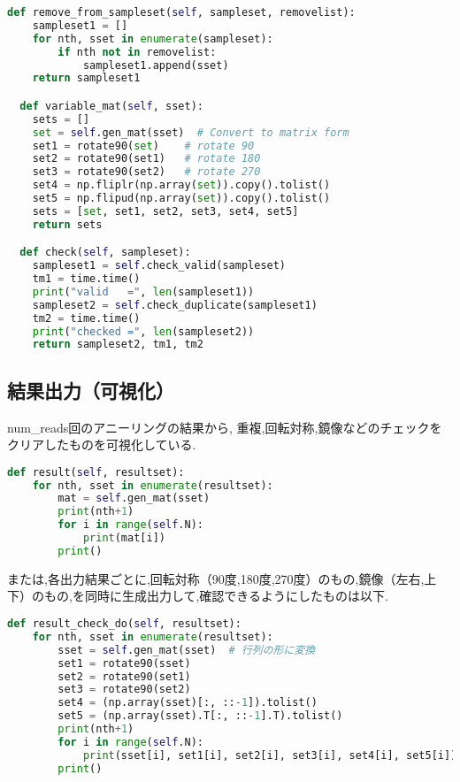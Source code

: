 \documentclass[uplatex,dvipdfmx,a4paper,11pt,oneside,openany]{jsbook}
\begin{document}
\begin{lstlisting}[language=Python]
  def remove_from_sampleset(self, sampleset, removelist):
    sampleset1 = []
    for nth, sset in enumerate(sampleset):
        if nth not in removelist:
            sampleset1.append(sset)
    return sampleset1

  def variable_mat(self, sset):
    sets = []
    set = self.gen_mat(sset)  # Convert to matrix form
    set1 = rotate90(set)    # rotate 90
    set2 = rotate90(set1)   # rotate 180
    set3 = rotate90(set2)   # rotate 270
    set4 = np.fliplr(np.array(set)).copy().tolist()
    set5 = np.flipud(np.array(set)).copy().tolist()
    sets = [set, set1, set2, set3, set4, set5]
    return sets

  def check(self, sampleset):
    sampleset1 = self.check_valid(sampleset)
    tm1 = time.time()
    print("valid   =", len(sampleset1))
    sampleset2 = self.check_duplicate(sampleset1)
    tm2 = time.time()
    print("checked =", len(sampleset2))
    return sampleset2, tm1, tm2
\end{lstlisting}

\subsection{結果出力（可視化）}

num\_reads回のアニーリングの結果から, 重複,回転対称,鏡像などのチェックをクリアしたものを可視化している.

\begin{lstlisting}[language=Python]
  def result(self, resultset):
    for nth, sset in enumerate(resultset):
        mat = self.gen_mat(sset)
        print(nth+1)
        for i in range(self.N):
            print(mat[i])
        print()
\end{lstlisting}

または,各出力結果ごとに,回転対称（90度,180度,270度）のもの,鏡像（左右,上下）のもの,を同時に生成出力して,確認できるようにしたものは以下.

\begin{lstlisting}[language=Python]
  def result_check_do(self, resultset):
    for nth, sset in enumerate(resultset):
        sset = self.gen_mat(sset)  # 行列の形に変換
        set1 = rotate90(sset)
        set2 = rotate90(set1)
        set3 = rotate90(set2)
        set4 = (np.array(sset)[:, ::-1]).tolist()
        set5 = (np.array(sset).T[:, ::-1].T).tolist()
        print(nth+1)
        for i in range(self.N):
            print(sset[i], set1[i], set2[i], set3[i], set4[i], set5[i])
        print()
\end{lstlisting}
\end{document}
